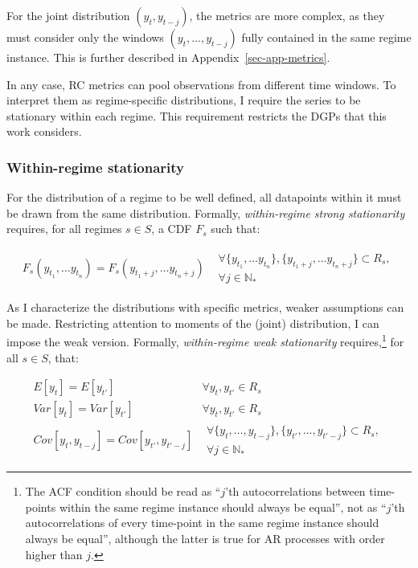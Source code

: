 \documentclass[
  letterpaper,
  DIV=11,
  numbers=noendperiod]{scrartcl}
\numberwithin{equation}{section}
\numberwithin{table}{section}
\numberwithin{figure}{section}
\begin{document}
For the joint distribution \((y_t, y_{t-j})\), the metrics are more
complex, as they must consider only the windows
\((y_t, \dots, y_{t-j})\) fully contained in the same regime instance.
This is further described in Appendix~\ref{sec-app-metrics}.

In any case, RC metrics can pool observations from different time
windows. To interpret them as regime-specific distributions, I require
the series to be stationary within each regime. This requirement
restricts the DGPs that this work considers.

\subsubsection{Within-regime
stationarity}\label{within-regime-stationarity}

For the distribution of a regime to be well defined, all datapoints
within it must be drawn from the same distribution. Formally,
\emph{within-regime strong stationarity} requires, for all regimes
\(s \in S\), a CDF \(F_s\) such that:

\begin{equation}
\begin{array}{cc}
    F_s(y_{t_1}, \dots y_{t_n}) = F_s(y_{t_1+j}, \dots y_{t_n+j})  & 
    \begin{array}{c}
        \forall \{y_{t_1}, \dots y_{t_n}\}, \{y_{t_1+j}, \dots y_{t_n+j}\} \subset R_s, \\
        \forall j \in \mathbb{N}_*
    \end{array}
\end{array}
\end{equation}

As I characterize the distributions with specific metrics, weaker
assumptions can be made. Restricting attention to moments of the (joint)
distribution, I can impose the weak version. Formally,
\emph{within-regime weak stationarity} requires,\footnote{The ACF
  condition should be read as ``\(j\)'th autocorrelations between
  time-points within the same regime instance should always be equal'',
  not as ``\(j\)'th autocorrelations of every time-point in the same
  regime instance should always be equal'', although the latter is true
  for AR processes with order higher than \(j\).} for all \(s \in S\),
that:

\begin{equation}
\begin{array}{cc}
    E[y_t] = E[y_{t'}] & \forall y_t, y_{t'} \in R_s \\
    Var[y_t] = Var[y_{t'}] & \forall y_t, y_{t'} \in R_s \\
    Cov[y_t, y_{t-j}] = Cov[y_{t'}, y_{t'-j}] & 
    \begin{array}{c}
        \forall \{y_t, \dots, y_{t-j}\}, \{y_{t'}, \dots, y_{t'-j}\} \subset R_s, \\
        \forall j \in \mathbb{N}_*
    \end{array}
\end{array}
\end{equation}
\end{document}
